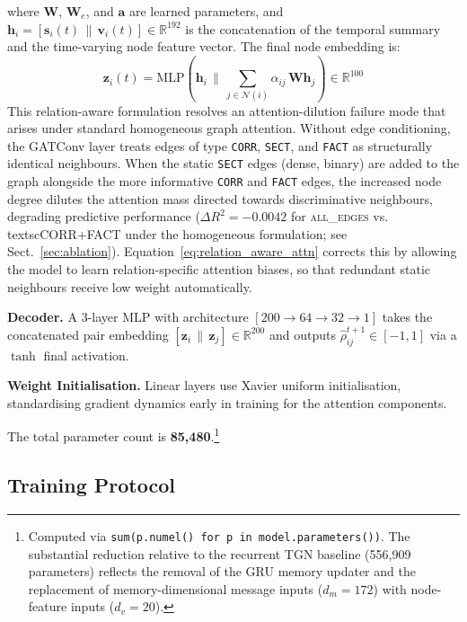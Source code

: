 \documentclass[runningheads]{llncs}
\begin{document}
where $\mathbf{W}$, $\mathbf{W}_e$, and $\mathbf{a}$ are learned parameters,
and $\mathbf{h}_i = [\mathbf{s}_i(t) \,\|\, \mathbf{v}_i(t)] \in \mathbb{R}^{192}$
is the concatenation of the temporal summary and the time-varying node feature
vector. The final node embedding is:
\begin{equation}
\mathbf{z}_i(t) = \mathrm{MLP}\!\left(\mathbf{h}_i \,\|\,
\sum_{j \in \mathcal{N}(i)} \alpha_{ij}\,\mathbf{W}\mathbf{h}_j
\right) \in \mathbb{R}^{100}
\end{equation}
This relation-aware formulation resolves an attention-dilution failure mode that arises under standard homogeneous graph attention. Without edge conditioning, the GATConv layer treats edges of type \texttt{CORR}, \texttt{SECT}, and \texttt{FACT} as structurally identical neighbours. When the static \texttt{SECT} edges (dense, binary) are added to the graph alongside the more informative \texttt{CORR} and \texttt{FACT} edges, the increased node degree dilutes the attention mass directed towards discriminative neighbours, degrading predictive performance ($\Delta R^2 = -0.0042$ for \textsc{all\_edges} vs.\\textsc{CORR+FACT} under the homogeneous formulation; see Sect.~\ref{sec:ablation}). Equation~\eqref{eq:relation_aware_attn} corrects this by allowing the model to learn relation-specific attention biases, so that redundant static neighbours receive low weight automatically.

\textbf{Decoder.} A 3-layer MLP with architecture $[200 \to 64 \to 32 \to 1]$ takes the concatenated pair embedding $[\mathbf{z}_i \,\|\, \mathbf{z}_j] \in \mathbb{R}^{200}$ and outputs $\hat{\rho}_{ij}^{t+1} \in [-1, 1]$ via a $\tanh$ final activation.

\textbf{Weight Initialisation.} Linear layers use Xavier uniform initialisation, standardising gradient dynamics early in training for the attention components.

The total parameter count is \textbf{85{,}480}.\footnote{Computed via \texttt{sum(p.numel() for p in model.parameters())}. The substantial reduction relative to the recurrent TGN baseline (556{,}909 parameters) reflects the removal of the GRU memory updater and the replacement of memory-dimensional message inputs ($d_m = 172$) with node-feature inputs ($d_v = 20$).}

\subsection{Training Protocol}\label{training-protocol-1}
\end{document}
